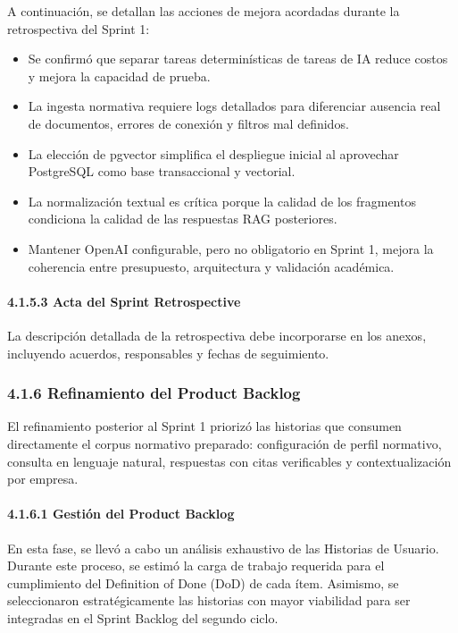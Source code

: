 \documentclass[12pt,a4paper,oneside]{report}
\begin{document}
A continuación, se detallan las acciones de mejora acordadas durante la
retrospectiva del Sprint 1:

\begin{itemize}
\item
  Se confirmó que separar tareas determinísticas de tareas de IA reduce
  costos y mejora la capacidad de prueba.
\item
  La ingesta normativa requiere logs detallados para diferenciar
  ausencia real de documentos, errores de conexión y filtros mal
  definidos.
\item
  La elección de pgvector simplifica el despliegue inicial al aprovechar
  PostgreSQL como base transaccional y vectorial.
\item
  La normalización textual es crítica porque la calidad de los
  fragmentos condiciona la calidad de las respuestas RAG posteriores.
\item
  Mantener OpenAI configurable, pero no obligatorio en Sprint 1, mejora
  la coherencia entre presupuesto, arquitectura y validación académica.
\end{itemize}

\paragraph{4.1.5.3 Acta del Sprint
Retrospective}\label{acta-del-sprint-retrospective}

La descripción detallada de la retrospectiva debe incorporarse en los
anexos, incluyendo acuerdos, responsables y fechas de seguimiento.

\subsubsection{4.1.6 Refinamiento del Product
Backlog}\label{refinamiento-del-product-backlog}

El refinamiento posterior al Sprint 1 priorizó las historias que
consumen directamente el corpus normativo preparado: configuración de
perfil normativo, consulta en lenguaje natural, respuestas con citas
verificables y contextualización por empresa.

\paragraph{4.1.6.1 Gestión del Product
Backlog}\label{gestiuxf3n-del-product-backlog}

En esta fase, se llevó a cabo un análisis exhaustivo de las Historias de
Usuario. Durante este proceso, se estimó la carga de trabajo requerida
para el cumplimiento del Definition of Done (DoD) de cada ítem.
Asimismo, se seleccionaron estratégicamente las historias con mayor
viabilidad para ser integradas en el Sprint Backlog del segundo ciclo.
\end{document}
